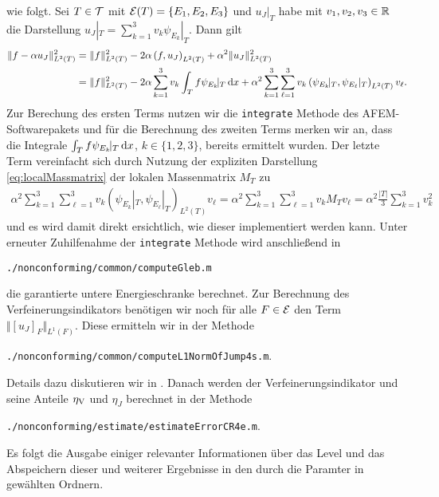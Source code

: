 wie folgt. 
Sei $T\in\mathcal{T}$ mit $\mathcal{E}(T)=\{E_1,E_2,E_3\}$ und $u_J|_T$ habe mit
$v_1,v_2,v_3\in\mathbb{R}$ die Darstellung $u_J|_T=\sum_{k=1}^3 v_k\psi_{E_k}\!|_T$.
Dann gilt
\begin{align*}
  \Vert f-\alpha u_J\Vert_{L^2(T)}^2 
  &=
  \Vert f\Vert_{L^2(T)}^2 - 2\alpha\left(f,u_J\right)_{L^2(T)} + \alpha^2 \Vert
  u_J\Vert_{L^2(T)}^2\\
  &=
  \Vert f\Vert_{L^2(T)}^2 
  - 2\alpha\sum_{k=1}^3 v_k\int_T f\psi_{E_k}\!|_T\,\mathrm{d}x
  + \alpha^2 \sum_{k=1}^3 \sum_{\ell=1}^3 
  v_k \left(\psi_{E_k}\!|_T,\psi_{E_\ell}|_T\right)_{L^2(T)}v_\ell.
\end{align*} Zur Berechung des ersten Terms nutzen wir die \texttt{integrate}
Methode des AFEM-Soft\-ware\-pakets und für die Berechnung des zweiten Terms
merken wir an, dass die Integrale $\int_T f\psi_{E_k}\!|_T\,\mathrm{d}x$,
$k\in\{1,2,3\}$, bereits ermittelt wurden.
Der letzte Term vereinfacht sich durch Nutzung der expliziten Darstellung
\eqref{eq:localMassmatrix} der lokalen Massenmatrix $M_T$ zu
\begin{align*}
  \alpha^2 \sum_{k=1}^3 \sum_{\ell=1}^3 
    v_k \left(\psi_{E_k}\!|_T,\psi_{E_\ell}|_T\right)_{L^2(T)}v_\ell
  =
  \alpha^2 \sum_{k=1}^3 \sum_{\ell=1}^3 
    v_k M_T v_\ell
  =
  \alpha^2\frac{|T|}{3}\sum_{k=1}^3 v_k^2
\end{align*}
und es wird damit direkt ersichtlich, wie dieser implementiert werden kann.
Unter erneuter Zuhilfenahme der \texttt{integrate} Methode wird anschließend
in
\begin{center}
  \texttt{./nonconforming/common/computeGleb.m}
\end{center}
die garantierte untere Energieschranke berechnet. 
Zur Berechnung des Verfeinerungsindikators benötigen wir noch
für alle $F\in\mathcal{E}$ den Term $\Vert[u_J]_F\Vert_{L^1(F)}$. Diese ermitteln wir
in der Methode 
\begin{center}
  \texttt{./nonconforming/common/computeL1NormOfJump4s.m}.
\end{center} 
Details dazu diskutieren wir in .
Danach werden der Verfeinerungsindikator
und seine Anteile $\eta_\textup{V}$ und $\eta_J$ berechnet in der Methode
\begin{center}
  \texttt{./nonconforming/estimate/estimateErrorCR4e.m}.
\end{center}
Es folgt die Ausgabe einiger relevanter Informationen über das Level und das
Abspeichern dieser und weiterer Ergebnisse in den durch die Paramter in
 gewählten Ordnern.
